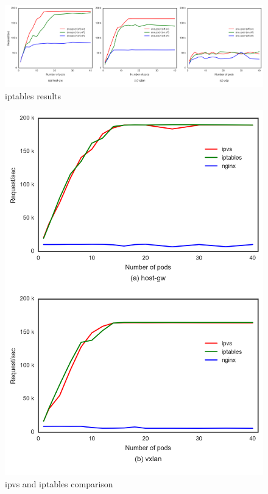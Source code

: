 \begin{figure}
\includegraphics[width=\textwidth]{Figs/iptables_3figs}
\caption{iptables results}
\label{fig:iptabls3figs}
\end{figure}


\begin{figure}
\includegraphics[width=\columnwidth]{Figs/ipvs-iptables-nginx_2figs}
\caption{ipvs and iptables comparison}
\label{fig:ipvs-iptables-nginx_2figs}
\end{figure}

